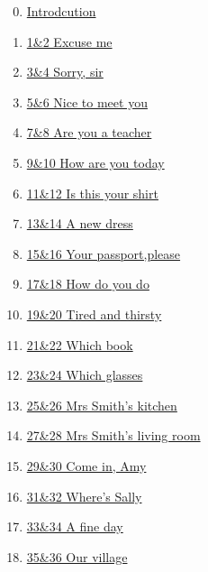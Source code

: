 \documentclass[11pt]{article}
\begin{document}
\begin{multicols}{2}
	\begin{enumerate}
		\setcounter{enumi}{-1}
		\item \href{https://mp.weixin.qq.com/s/hrBaw5BboXhMaBqWHmsgyg}{Introdcution}	%
		\item \href{https://mp.weixin.qq.com/s/vQ6mtY3avmZ9h9Ftys2fGw}{1\&2 Excuse me}	%
		\item \href{https://mp.weixin.qq.com/s/XrvcXEbvg-KbyFciyJq_1g}{3\&4 Sorry, sir}	%
		\item \href{https://mp.weixin.qq.com/s/GAx2oHiJW1zEzQFXRxULjA}{5\&6 Nice to meet you}	%
		\item \href{https://mp.weixin.qq.com/s/0x5eZsHQrzp1VVoUBa8JoA}{7\&8 Are you a teacher}	%
		\item \href{https://mp.weixin.qq.com/s/QA5UP6vNhfQfbAK54OZUXg}{9\&10 How are you today}	%
		\item \href{https://mp.weixin.qq.com/s/j-RQmZx9oanP3UkYtjKIPA}{11\&12 Is this your shirt}	%
		\item \href{https://mp.weixin.qq.com/s/hSCJc6kKoj6g1wbCPVmGIA}{13\&14 A new dress}	%
		\item \href{https://mp.weixin.qq.com/s/CeBlLjp4KwSn9v6sXexdYA}{15\&16 Your passport,please}	%
		\item \href{https://mp.weixin.qq.com/s/li3ORR4iGQGzXPGzzb_rlg}{17\&18 How do you do}	%
		\item \href{https://mp.weixin.qq.com/s/6nVGQPPb-90O5scFiS8gQQ}{19\&20 Tired and thirsty}	%
		\item \href{https://mp.weixin.qq.com/s/rPtiaLJCtjtFBiqIkCL4Yw}{21\&22 Which book}	%
		\item \href{https://mp.weixin.qq.com/s/GLMNK_ykLGE_OwVMn3xnhg}{23\&24 Which glasses}	%
		\item \href{https://mp.weixin.qq.com/s/JWuBpznLEfit2XImoySTkA}{25\&26 Mrs Smith's kitchen}	%
		\item \href{https://mp.weixin.qq.com/s/G4jxkHeUS3QPhdukVKvBWA}{27\&28 Mrs Smith's living room}	%
		\item \href{https://mp.weixin.qq.com/s/gX5Ky6FJX5mgu5C3y6ca6A}{29\&30 Come in, Amy}	%
		\item \href{https://mp.weixin.qq.com/s/RF-ODPCo5PEmEkwwyZkCxg}{31\&32 Where's Sally}	%
		\item \href{https://mp.weixin.qq.com/s/YwUWH366czkONdSN9uM1ng}{33\&34 A fine day}	%
		\item \href{https://mp.weixin.qq.com/s/W81EC9hRTLucZpabGybYaA}{35\&36 Our village}	%

\end{enumerate}
\end{multicols}
\end{document}

